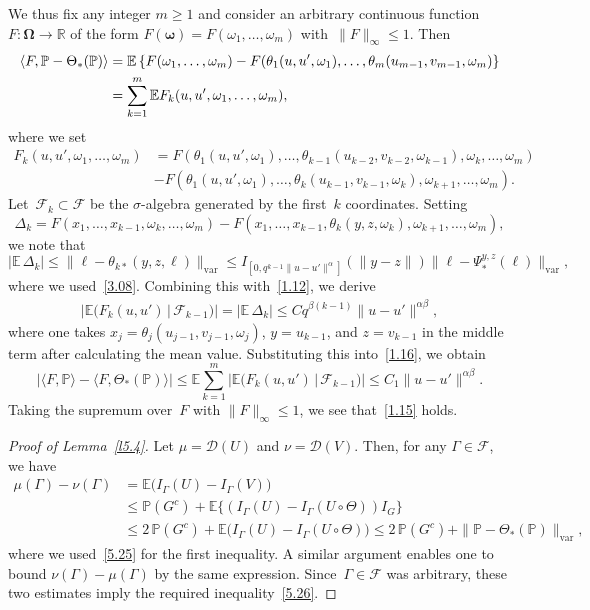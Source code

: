 \documentclass[JEP,XML,SOM,Unicode,ThmDefs]{cedram}
\let\mathcal\mathscr
\theoremstyle{plain}
\numberwithin{equation}{section}
\newcommand{\R}{{\mathbb R}}
\newcommand{\IP}{{\mathbb P}}
\newcommand{\E}{{\mathbb E}}
\newcommand{\OOmega}{{\boldsymbol\Omega}}
\newcommand{\oomega}{{\boldsymbol\omega}}
\newcommand{\DD}{{\mathcal D}}
\newcommand{\FF}{{\mathcal F}}
\begin{document}
We thus fix any integer $m\ge1$ and consider an arbitrary continuous function $F:\OOmega\to\R$ of the form $F(\oomega)=F(\omega_1,\dots,\omega_m)$ with~$\|F\|_\infty\le 1$. Then
\begin{align}
\langle F,\IP-\Theta_*(\IP)\rangle
&=\E\left\{F(\omega_1,\dots,\omega_m)
-F(\theta_1(u,u',\omega_1),\dots,\theta_m(u_{m-1},v_{m-1},\omega_m)\right\}
\notag\\
&=\sum_{k=1}^m \E F_k(u,u',\omega_1,\dots,\omega_m),
\label{1.16}
\end{align}
where we set
\begin{align*}
F_k(u,u',\omega_1,\dots,\omega_m)
&=F(\theta_1(u,u',\omega_1),\dots,\theta_{k-1}(u_{k-2},v_{k-2},\omega_{k-1}),\omega_k,\dots,\omega_m)\\
&-F(\theta_{1}(u,u',\omega_1),\dots,\theta_{k}(u_{k-1},v_{k-1},\omega_{k}),\omega_{k+1},\dots,\omega_m).
\end{align*}
Let~$\FF_k\subset\FF$ be the $\sigma$-algebra generated by the first~$k$ coordinates. Setting
\[
\Delta_k=F(x_1,\dots,x_{k-1},\omega_k,\dots,\omega_m)
-F(x_1,\dots,x_{k-1},\theta_{k}(y,z,\omega_{k}),\omega_{k+1},\dots,\omega_m),
\]
we note that
\[
|\E\,\Delta_k|\le \|\ell-\theta_{k*}(y,z,\ell)\|_{\mathrm{var}}
\le I_{[0,q^{k-1}\|u-u'\|^\alpha]}(\|y-z\|)\|\ell-\varPsi_*^{y,z}(\ell)\|_{\mathrm{var}},
\]
where we used~\eqref{3.08}. Combining this with~\eqref{1.12}, we derive
\begin{align*}
\bigl|\E\bigl(F_k(u,u')\,|\,\FF_{k-1}\bigr)\bigr|=|\E\,\Delta_k|
\le Cq^{\beta(k-1)}\|u-u'\|^{\alpha\beta},
\end{align*}
where one takes $x_j =\theta_j(u_{j-1},v_{j-1},\omega_j)$, $y=u_{k-1}$, and $z=v_{k-1}$ in the middle term after calculating the mean value.
Substituting this into~\eqref{1.16}, we obtain
\[
|\langle F,\IP\rangle-\langle F,\Theta_*(\IP)\rangle|
\le \E\sum_{k=1}^m \bigl|\E\bigl(F_k(u,u')\,|\,\FF_{k-1}\bigr)\bigr|
\le C_1\|u-u'\|^{\alpha\beta}.
\]
Taking the supremum over~$F$ with $\|F\|_\infty\le1$, we see that~\eqref{1.15} holds.

\begin{proof}[Proof of Lemma~\ref{l5.4}]
Let $\mu=\DD(U)$ and $\nu=\DD(V)$. Then, for any $\Gamma\in\FF$, we have
\begin{align*}
\mu(\Gamma)-\nu(\Gamma)
&=\E\bigl(I_\Gamma(U)-I_\Gamma(V)\bigl)\\
&\le \IP(G^c)+\E\bigl\{(I_\Gamma(U)-I_\Gamma(U\circ\Theta))I_G\bigl\}\\
&\le 2\,\IP(G^c)+\E\bigl(I_\Gamma(U)-I_\Gamma(U\circ\Theta)\bigl)
\le 2\,\IP(G^c)+\|\IP-\Theta_*(\IP)\|_{\mathrm{var}},
\end{align*}
where we used~\eqref{5.25} for the first inequality.
A similar argument enables one to bound $\nu(\Gamma)-\mu(\Gamma)$ by the same expression. Since~$\Gamma\in\FF$ was arbitrary, these two estimates imply the required inequality~\eqref{5.26}.
\end{proof}
\end{document}
